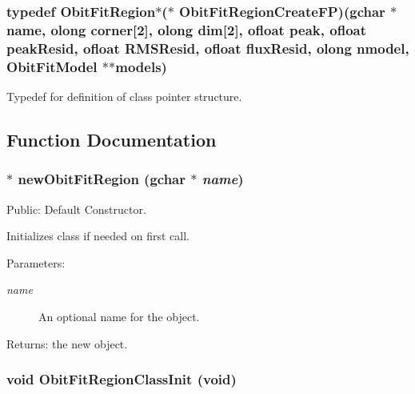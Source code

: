 \subsubsection{\setlength{\rightskip}{0pt plus 5cm}typedef {\bf Obit\-Fit\-Region}$\ast$($\ast$ {\bf Obit\-Fit\-Region\-Create\-FP})(gchar $\ast$name, {\bf olong} corner[2], {\bf olong} dim[2], {\bf ofloat} peak, {\bf ofloat} peak\-Resid, {\bf ofloat} RMSResid, {\bf ofloat} flux\-Resid, {\bf olong} nmodel, {\bf Obit\-Fit\-Model} $\ast$$\ast$models)}\label{ObitFitRegion_8h_a3}


Typedef for definition of class pointer structure. 



\subsection{Function Documentation}
\subsubsection{$\ast$ new\-Obit\-Fit\-Region (gchar $\ast$ {\em name})}\label{ObitFitRegion_8h_a5}


Public: Default Constructor. 

Initializes class if needed on first call. \begin{Desc}
\item[Parameters:]
\begin{description}
\item[{\em name}]An optional name for the object. \end{description}
\end{Desc}
\begin{Desc}
\item[Returns:]the new object. \end{Desc}
\subsubsection{\setlength{\rightskip}{0pt plus 5cm}void Obit\-Fit\-Region\-Class\-Init (void)}\label{ObitFitRegion_8h_a4}


